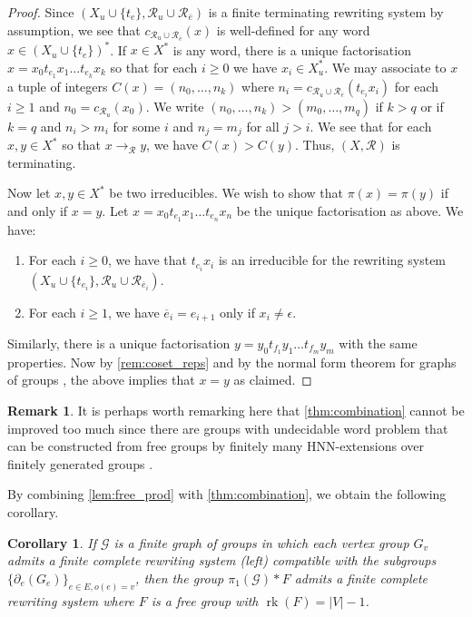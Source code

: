 \documentclass[12pt, a4paper]{amsart}
\newtheorem{corollary}[theorem]{Corollary}
\theoremstyle{definition}
\newtheorem{remark}[theorem]{Remark}
\DeclareMathOperator{\rk}{rk}
\begin{document}
\begin{proof}
Since $(X_u\cup \{t_{e}\}, \mathcal{R}_u\cup\mathcal{R}_{\overline{e}})$ is a finite terminating rewriting system by assumption, we see that $c_{\mathcal{R}_u\cup\mathcal{R}_{\overline{e}}}(x)$ is well-defined for any word $x\in (X_u\cup\{t_e\})^*$. If $x\in X^*$ is any word, there is a unique factorisation $x = x_0t_{e_1}x_1\ldots t_{e_k}x_k$ so that for each $i\geqslant 0$ we have $x_i\in X_u^*$. We may associate to $x$ a tuple of integers $C(x) = (n_0, \ldots, n_k)$ where $n_i = c_{\mathcal{R}_u\cup\mathcal{R}_{\overline{e}}}(t_{e_i}x_i)$ for each $i\geqslant 1$ and $n_0 = c_{\mathcal{R}_u}(x_0)$. We write $(n_0, \ldots, n_k)>(m_0, \ldots, m_q)$ if $k>q$ or if $k = q$ and $n_i>m_i$ for some $i$ and $n_j = m_j$ for all $j>i$. We see that for each $x, y\in X^*$ so that $x\to_{\mathcal{R}}y$, we have $C(x)>C(y)$. Thus, $(X, \mathcal{R})$ is terminating.

Now let $x, y\in X^*$ be two irreducibles. We wish to show that $\pi(x) = \pi(y)$ if and only if $x = y$. Let $x = x_0t_{e_1}x_1\ldots t_{e_n}x_n$ be the unique factorisation as above. We have:
\begin{enumerate}
\item For each $i\geqslant 0$, we have that $t_{e_i}x_i$ is an irreducible for the rewriting system $(X_u\cup\{t_{e_i}\}, \mathcal{R}_u\cup\mathcal{R}_{\overline{e}_i})$.
\item For each $i\geqslant 1$, we have $\overline{e}_i =  e_{i+1}$ only if $x_{i}\neq \epsilon$.
\end{enumerate}
Similarly, there is a unique factorisation $y = y_0t_{f_1}y_1\ldots t_{f_m}y_m$ with the same properties. Now by \cref{rem:coset_reps} and by the normal form theorem for graphs of groups \cite{Higgins1976}, the above implies that $x = y$ as claimed.
\end{proof}

\begin{remark}
It is perhaps worth remarking here that \cref{thm:combination} cannot be improved too much since there are groups with undecidable word problem that can be constructed from free groups by finitely many HNN-extensions over finitely generated groups \cite{CM99}.
\end{remark}


By combining \cref{lem:free_prod} with \cref{thm:combination}, we obtain the following corollary.


\begin{corollary}
\label{cor:combination}
If $\mathcal{G}$ is a finite graph of groups in which each vertex group $G_v$ admits a finite complete rewriting system (left) compatible with the subgroups $\{\partial_e(G_e)\}_{e\in E, o(e) = v}$, then the group $\pi_1(\mathcal{G})*F$ admits a finite complete rewriting system where $F$ is a free group with $\rk(F) = |V| -1$.
\end{corollary}
\end{document}
